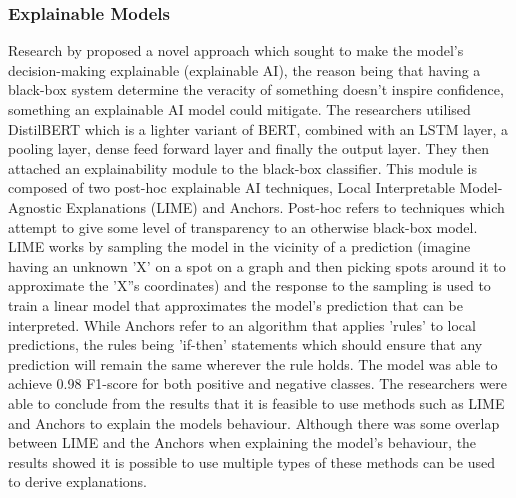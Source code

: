 \documentclass[stu,12pt,floatsintext,donotrepeattitle]{apa7}
\begin{document}
\subsubsection{Explainable Models}
Research by \textcite{xai-bert} proposed a novel approach which sought to make the model's decision-making explainable (explainable AI), the reason being that having a black-box system determine the veracity of something doesn't inspire confidence, something an explainable AI model could mitigate. The researchers utilised DistilBERT which is a lighter variant of BERT, combined with an LSTM layer, a pooling layer, dense feed forward layer and finally the output layer. They then attached an explainability module to the black-box classifier. This module is composed of two post-hoc explainable AI techniques, Local Interpretable Model-Agnostic Explanations (LIME) and Anchors. Post-hoc refers to techniques which attempt to give some level of transparency to an otherwise black-box model. LIME works by sampling the model in the vicinity of a prediction (imagine having an unknown 'X' on a spot on a graph and then picking spots around it to approximate the 'X''s coordinates) and the response to the sampling is used to train a linear model that approximates the model's prediction that can be interpreted. While Anchors refer to an algorithm that applies 'rules' to local predictions, the rules being 'if-then' statements which should ensure that any prediction will remain the same wherever the rule holds. The model was able to achieve 0.98 F1-score for both positive and negative classes. The researchers were able to conclude from the results that it is feasible to use methods such as LIME and Anchors to explain the models behaviour. Although there was some overlap between LIME and the Anchors when explaining the model's behaviour, the results showed it is possible to use multiple types of these methods can be used to derive explanations. 
\end{document}
